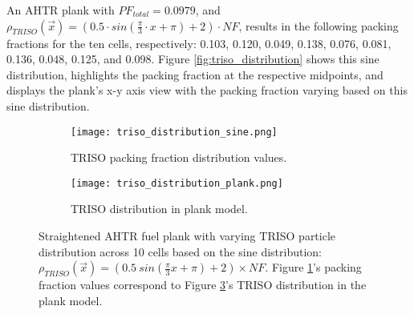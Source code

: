 An \gls{AHTR} plank with $PF_{total} = 0.0979$, and 
$\rho_{TRISO}(\vec{x}) = \left(0.5\cdot sin(\frac{\pi}{3}\cdot x + \pi) + 2\right) 
\cdot NF$, results in the following packing fractions for the ten cells, respectively: 
0.103, 0.120, 0.049, 0.138, 0.076, 0.081, 0.136, 0.048, 0.125, and 0.098. 
Figure \ref{fig:triso_distribution} shows this sine distribution, highlights 
the packing fraction at the respective midpoints, and displays the plank's x-y 
axis view with the packing fraction varying based on this sine distribution. 
\begin{figure}[htbp]
    \begin{subfigure}{\textwidth}
        \centering
        \texttt{[image: triso\_distribution\_sine.png]}
        \caption{TRISO packing fraction distribution values.}
        \label{fig:ahtr-plank-triso-distr-squares} 
    \end{subfigure}
    \begin{subfigure}{\textwidth}
        \centering
        \texttt{[image: triso\_distribution\_plank.png]}
        \raggedright
        \caption{TRISO distribution in plank model.}
        \label{fig:ahtr-plank-triso-distr} 
    \end{subfigure}
    \caption{Straightened \acrfull{AHTR} fuel plank with varying \gls{TRISO} particle 
        distribution across 10 cells based on the sine distribution: 
        $\rho_{TRISO}(\vec{x}) = (0.5\ sin(\frac{\pi}{3}x + \pi) + 2)  \times NF$.
        Figure \ref{fig:ahtr-plank-triso-distr-squares}'s packing fraction values 
        correspond to Figure \ref{fig:ahtr-plank-triso-distr}'s  TRISO distribution in 
        the plank model.}
\end{figure}

